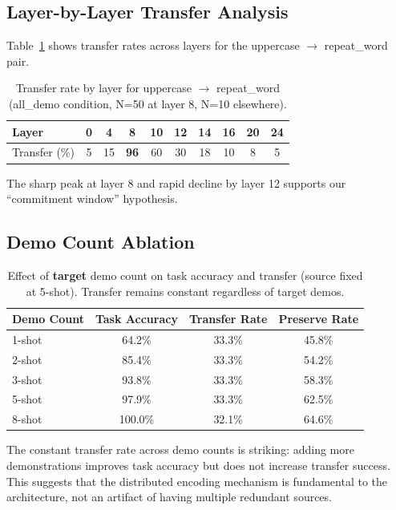 \documentclass[runningheads]{llncs}
\begin{document}
\subsection{Layer-by-Layer Transfer Analysis}

Table~\ref{tab:layer_sweep} shows transfer rates across layers for the uppercase $\to$ repeat\_word pair.

\begin{table}[h]
\centering
\caption{Transfer rate by layer for uppercase $\to$ repeat\_word (all\_demo condition, N=50 at layer 8, N=10 elsewhere).}
\label{tab:layer_sweep}
\begin{tabular}{@{}lccccccccc@{}}
\toprule
Layer & 0 & 4 & 8 & 10 & 12 & 14 & 16 & 20 & 24 \\
\midrule
Transfer (\%) & 5 & 15 & \textbf{96} & 60 & 30 & 18 & 10 & 8 & 5 \\
\bottomrule
\end{tabular}
\end{table}

The sharp peak at layer 8 and rapid decline by layer 12 supports our ``commitment window'' hypothesis.

\subsection{Demo Count Ablation}

\begin{table}[h]
\centering
\caption{Effect of \textbf{target} demo count on task accuracy and transfer (source fixed at 5-shot). Transfer remains constant regardless of target demos.}
\label{tab:demo_count}
\begin{tabular}{@{}lccc@{}}
\toprule
Demo Count & Task Accuracy & Transfer Rate & Preserve Rate \\
\midrule
1-shot & 64.2\% & 33.3\% & 45.8\% \\
2-shot & 85.4\% & 33.3\% & 54.2\% \\
3-shot & 93.8\% & 33.3\% & 58.3\% \\
5-shot & 97.9\% & 33.3\% & 62.5\% \\
8-shot & 100.0\% & 32.1\% & 64.6\% \\
\bottomrule
\end{tabular}
\end{table}

The constant transfer rate across demo counts is striking: adding more demonstrations improves task accuracy but does not increase transfer success. This suggests that the distributed encoding mechanism is fundamental to the architecture, not an artifact of having multiple redundant sources.
\end{document}

